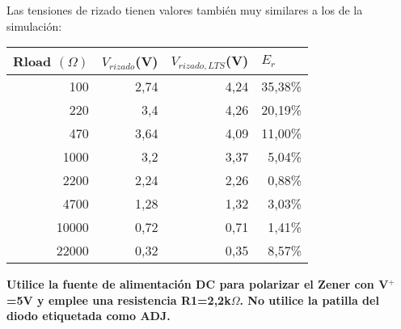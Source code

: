 \documentclass{article}
\begin{document}
Las tensiones de rizado tienen valores también muy similares a los de la simulación:
\begin{table}[ht!]
\centering
\begin{tabular}{|r|r|r|r|}
\hline
\multicolumn{1}{|l|}{Rload $(\Omega)$} & \multicolumn{1}{l|}{$V_{rizado}$(V)} & \multicolumn{1}{l|}{$V_{rizado, LTS}$(V)} & \multicolumn{1}{l|}{$E_{r}$} \\ \hline
100                                    & 2,74                                                      & 4,24                                      & 35,38\%                                           \\ \hline
220                                    & 3,4                                                       & 4,26                                      & 20,19\%                                           \\ \hline
470                                    & 3,64                                                      & 4,09                                      & 11,00\%                                           \\ \hline
1000                                   & 3,2                                                       & 3,37                                      & 5,04\%                                            \\ \hline
2200                                   & 2,24                                                      & 2,26                                      & 0,88\%                                            \\ \hline
4700                                   & 1,28                                                      & 1,32                                      & 3,03\%                                            \\ \hline
10000                                  & 0,72                                                      & 0,71                                      & 1,41\%                                            \\ \hline
22000                                  & 0,32                                                      & 0,35                                      & 8,57\%                                            \\ \hline
\end{tabular}
\end{table}

\clearpage
\textbf{Utilice la fuente de alimentación DC para polarizar el Zener con V$^+$=5V y emplee una
resistencia R1=2,2k$\Omega$. No utilice la patilla del diodo etiquetada como ADJ.}
\end{document}
